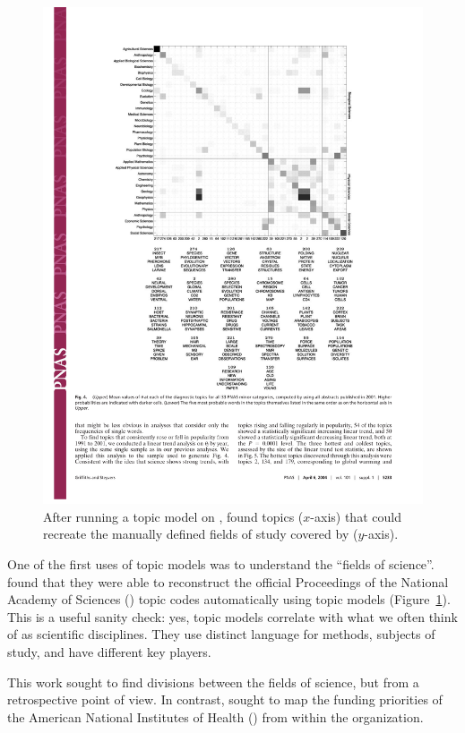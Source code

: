 \begin{figure}
  \begin{center}
  \includegraphics[width=.8\linewidth]{figures/sci_gs}
  \end{center}
  \caption{After running a topic model on ,
    \citet{griffiths-04} found topics ($x$-axis) that could recreate
    the manually defined fields of study covered by 
    ($y$-axis).}
\label{fig:pnas}
\end{figure}

One of the first uses of topic models was to understand the ``fields
of science''.  \citet{griffiths-04} found that they were able to
reconstruct the official Proceedings of the National Academy of Sciences () topic codes automatically using
topic models (Figure~\ref{fig:pnas}).  This is a useful sanity check:
yes, topic models correlate with what we often think of as scientific
disciplines.  They use distinct language for methods, subjects of
study, and have different key players.

This work sought to find divisions between the fields of science, but from a retrospective point of view.
In contrast, \citet{talley-11} sought to map the funding priorities of the American National Institutes
of Health () from within the organization.

